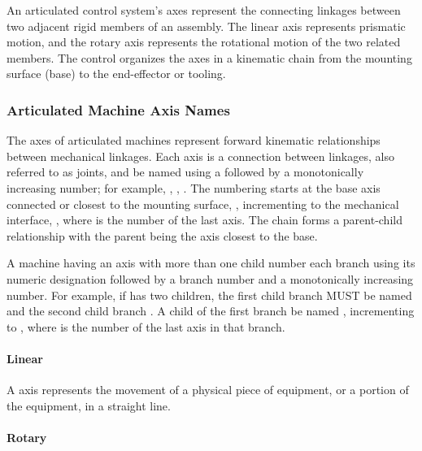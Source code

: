 An articulated control system's axes represent the connecting linkages between two adjacent rigid members of an assembly. The \gls{linear} axis represents prismatic motion, and the \gls{rotary} axis represents the rotational motion of the two related members. The control organizes the axes in a kinematic chain from the mounting surface (base) to the end-effector or tooling.

\subsubsection{Articulated Machine Axis Names}
\label{sec:Articulated Machine Axis Names}

The axes of articulated machines represent forward kinematic relationships between mechanical linkages. Each axis is a connection between linkages, also referred to as joints, and \MUST be named using a  followed by a monotonically increasing number; for example, , , .  The numbering starts at the base axis connected or closest to the mounting surface, , incrementing to the mechanical interface, , where  is the number of the last axis. The chain forms a parent-child relationship with the parent being the axis closest to the base.

A machine having an axis with more than one child \MUST number each branch using its numeric designation followed by a branch number and a monotonically increasing number. For example, if  has two children, the first child branch MUST be named  and the second child branch . A child of the first branch \MUST be named , incrementing to , where  is the number of the last axis in that branch.

\FloatBarrier

\paragraph{Linear}\mbox{}
\label{sec:Linear}



A  axis represents the movement of a physical piece of equipment, or a portion of the equipment, in a straight line. 


\paragraph{Rotary}\mbox{}
\label{sec:Rotary}



